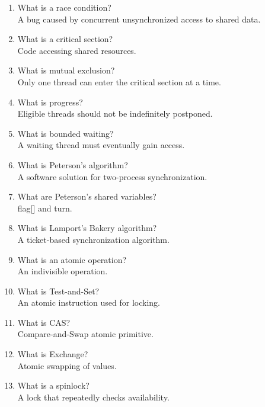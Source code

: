 \begin{enumerate}
\item What is a race condition?\\
A bug caused by concurrent unsynchronized access to shared data.

\item What is a critical section?\\
Code accessing shared resources.

\item What is mutual exclusion?\\
Only one thread can enter the critical section at a time.

\item What is progress?\\
Eligible threads should not be indefinitely postponed.

\item What is bounded waiting?\\
A waiting thread must eventually gain access.

\item What is Peterson's algorithm?\\
A software solution for two-process synchronization.

\item What are Peterson's shared variables?\\
flag[] and turn.

\item What is Lamport's Bakery algorithm?\\
A ticket-based synchronization algorithm.

\item What is an atomic operation?\\
An indivisible operation.

\item What is Test-and-Set?\\
An atomic instruction used for locking.

\item What is CAS?\\
Compare-and-Swap atomic primitive.

\item What is Exchange?\\
Atomic swapping of values.

\item What is a spinlock?\\
A lock that repeatedly checks availability.


\end{enumerate}
